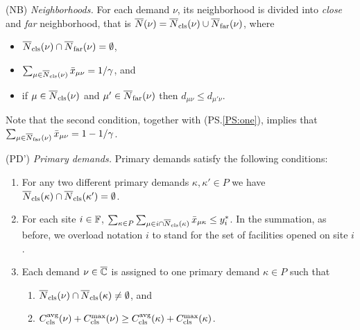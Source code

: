 \begin{description}
	
      \renewcommand{\theenumii}{(\alph{enumii})}
      \renewcommand{\labelenumii}{\theenumii}

\item{(NB)} \label{NB}
	\emph{Neighborhoods.}
	For each demand $\nu$, its neighborhood is divided into \emph{close} and
	\emph{far} neighborhood, that is ${\overline{N}}(\nu) = {\overline{N}}_{\text{cls}}(\nu) \cup {\overline{N}}_{\text{far}}(\nu)$, where
	\begin{itemize}
	\item ${\overline{N}}_{\text{cls}}(\nu) \cap {\overline{N}}_{\text{far}}(\nu) = \emptyset$,
	\item $\sum_{\mu\in{\overline{N}}_{\text{cls}}(\nu)} {\bar x}_{\mu\nu} =1/\gamma$, and 
	\item if $\mu\in {\overline{N}}_{\text{cls}}(\nu)$ and $\mu'\in {\overline{N}}_{\text{far}}(\nu)$ 
				then $d_{\mu\nu}\le d_{\mu'\nu}$.   
	\end{itemize}
	Note that the second condition, together with (PS.\ref{PS:one}), implies
	that $\sum_{\mu\in{\overline{N}}_{\text{far}}(\nu)} {\bar x}_{\mu\nu} =1-1/\gamma$.

\item{(PD')} \emph{Primary demands.}
	Primary demands satisfy the following conditions:

	\begin{enumerate}
		
	\item\label{PD1:disjoint}  For any two different primary demands $\kappa,\kappa'\in P$ we have
				${\overline{N}}_{\text{cls}}(\kappa)\cap {\overline{N}}_{\text{cls}}(\kappa') = \emptyset$.

	\item \label{PD1:yi} For each site $i\in\mathbb{F}$, 
		$ \sum_{\kappa\in P}\sum_{\mu\in
                  i\cap{\overline{N}}_{\text{cls}}(\kappa)}{\bar x}_{\mu\kappa} \leq
                y_i^\ast$. In the summation, as before, we overload notation $i$ to stand for the set of
						facilities opened on site $i$.
		
	\item \label{PD1:assign} Each demand $\nu\in\overline{\mathbb{C}}$ is assigned
        to one primary demand $\kappa\in P$ such that

  			\begin{enumerate}
	
				\item \label{PD1:assign:overlap} ${\overline{N}}_{\text{cls}}(\nu) \cap {\overline{N}}_{\text{cls}}(\kappa) \neq \emptyset$, and
				\item \label{PD1:assign:cost}
          $C_{\text{cls}}^{{\mbox{\scriptsize\rm avg}}}(\nu)+C_{\text{cls}}^{\max}(\nu) \geq
          C_{\text{cls}}^{{\mbox{\scriptsize\rm avg}}}(\kappa)+C_{\text{cls}}^{\max}(\kappa)$.
			\end{enumerate}


\end{enumerate}
\end{description}
